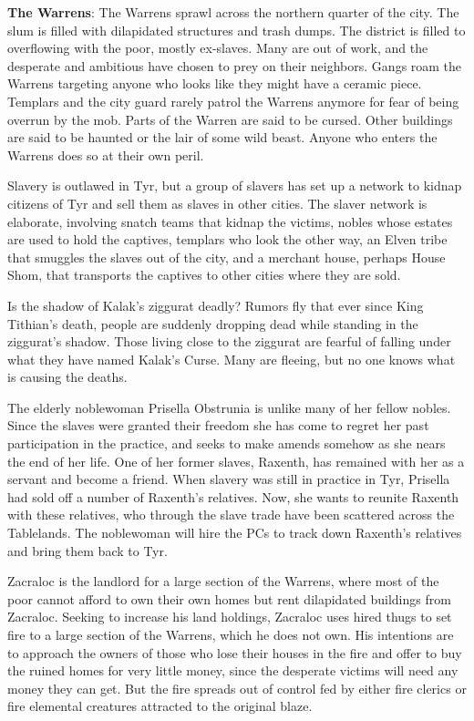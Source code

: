 {	\textbf{The Warrens}: The Warrens sprawl across the northern quarter of the city. The slum is filled with dilapidated structures and trash dumps. The district is filled to overflowing with the poor, mostly ex-slaves. Many are out of work, and the desperate and ambitious have chosen to prey on their neighbors. Gangs roam the Warrens targeting anyone who looks like they might have a ceramic piece. Templars and the city guard rarely patrol the Warrens anymore for fear of being overrun by the mob. Parts of the Warren are said to be cursed. Other buildings are said to be haunted or the lair of some wild beast. Anyone who enters the Warrens does so at their own peril.
}
{
	\item Slavery is outlawed in Tyr, but a group of slavers has set up a network to kidnap citizens of Tyr and sell them as slaves in other cities. The slaver network is elaborate, involving snatch teams that kidnap the victims, nobles whose estates are used to hold the captives, templars who look the other way, an Elven tribe that smuggles the slaves out of the city, and a merchant house, perhaps House Shom, that transports the captives to other cities where they are sold.
	\item Is the shadow of Kalak's ziggurat deadly? Rumors fly that ever since King Tithian's death, people are suddenly dropping dead while standing in the ziggurat's shadow. Those living close to the ziggurat are fearful of falling under what they have named Kalak's Curse. Many are fleeing, but no one knows what is causing the deaths.
	\item The elderly noblewoman Prisella Obstrunia is unlike many of her fellow nobles. Since the slaves were granted their freedom she has come to regret her past participation in the practice, and seeks to make amends somehow as she nears the end of her life. One of her former slaves, Raxenth, has remained with her as a servant and become a friend. When slavery was still in practice in Tyr, Prisella had sold off a number of Raxenth's relatives. Now, she wants to reunite Raxenth with these relatives, who through the slave trade have been scattered across the Tablelands. The noblewoman will hire the PCs to track down Raxenth's relatives and bring them back to Tyr.
	\item Zacraloc is the landlord for a large section of the Warrens, where most of the poor cannot afford to own their own homes but rent dilapidated buildings from Zacraloc. Seeking to increase his land holdings, Zacraloc uses hired thugs to set fire to a large section of the Warrens, which he does not own. His intentions are to approach the owners of those who lose their houses in the fire and offer to buy the ruined homes for very little money, since the desperate victims will need any money they can get. But the fire spreads out of control fed by either fire clerics or fire elemental creatures attracted to the original blaze.
}
